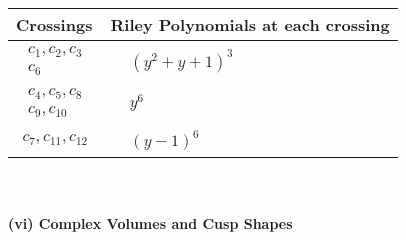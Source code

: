 \documentclass[1p]{elsarticle_modified}
\theoremstyle{definition}
\begin{document}
\begin{tabular}{m{50pt}|m{274pt}}
Crossings & \hspace{64pt}Riley Polynomials at each crossing \\
\hline $$\begin{aligned}c_{1},c_{2},c_{3}\\c_{6}\end{aligned}$$&$\begin{aligned}
&(y^2+y+1)^3
\end{aligned}$\\
\hline $$\begin{aligned}c_{4},c_{5},c_{8}\\c_{9},c_{10}\end{aligned}$$&$\begin{aligned}
&y^6
\end{aligned}$\\
\hline $$\begin{aligned}c_{7},c_{11},c_{12}\end{aligned}$$&$\begin{aligned}
&(y-1)^6
\end{aligned}$\\
\hline
\end{tabular}\\~\\
\newpage\flushleft \textbf{(vi) Complex Volumes and Cusp Shapes}
\end{document}
